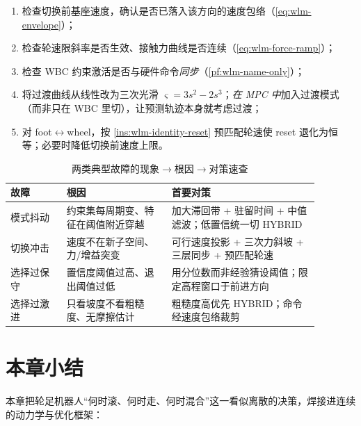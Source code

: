 \begin{enumerate}
  \item 检查切换前基座速度，确认是否已落入该方向的速度包络（\cref{eq:wlm-envelope}）；
  \item 检查轮速限斜率是否生效、接触力曲线是否连续（\cref{eq:wlm-force-ramp}）；
  \item 检查 WBC 约束激活是否与硬件命令\emph{同步}（\cref{pf:wlm-name-only}）；
  \item 将过渡曲线从线性改为三次光滑 $\varsigma=3s^2-2s^3$；\emph{在 MPC 中}加入过渡模式（而非只在 WBC 里切），让预测轨迹本身就考虑过渡；
  \item 对 foot$\leftrightarrow$wheel，按 \cref{ins:wlm-identity-reset} 预匹配轮速使 reset 退化为恒等；必要时降低切换前速度上限。
\end{enumerate}

\begin{table}[H]\centering\small
\caption{两类典型故障的现象$\to$根因$\to$对策速查}
\label{tab:wlm-debug}
\begin{tabular}{p{0.16\linewidth}p{0.30\linewidth}p{0.42\linewidth}}
\toprule
故障 & 根因 & 首要对策 \\
\midrule
模式抖动 & 约束集每周期变、特征在阈值附近穿越 & 加大滞回带 + 驻留时间 + 中值滤波；低置信统一切 HYBRID \\
切换冲击 & 速度不在新子空间、力/增益突变 & 可行速度投影 + 三次力斜坡 + 三层同步 + 预匹配轮速 \\
选择过保守 & 置信度阈值过高、退出阈值过低 & 用分位数而非经验猜设阈值；限定高程窗口于前进方向 \\
选择过激进 & 只看坡度不看粗糙度、无摩擦估计 & 粗糙度高优先 HYBRID；命令经速度包络裁剪 \\
\bottomrule
\end{tabular}
\end{table}

\section*{本章小结}

本章把轮足机器人“何时滚、何时走、何时混合”这一看似离散的决策，焊接进连续的动力学与优化框架：

